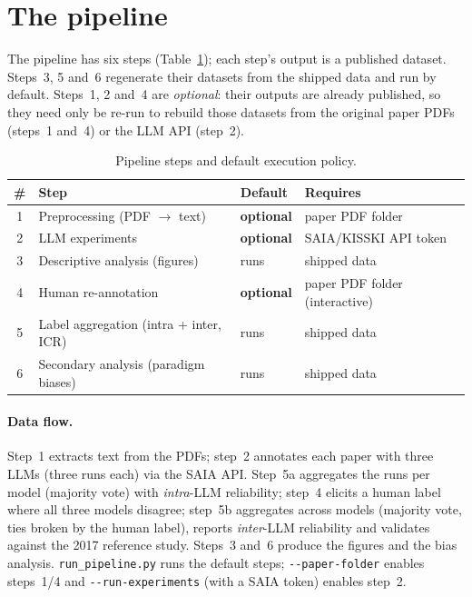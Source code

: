 \documentclass[english,biblatex]{lni}
\begin{document}
\section{The pipeline}
The pipeline has six steps (Table~\ref{tab:steps}); each step's output is a
published dataset. Steps~3, 5 and~6 regenerate their datasets from the shipped data
and run by default. Steps~1, 2 and~4 are \emph{optional}: their outputs are already
published, so they need only be re-run to rebuild those datasets from the original
paper PDFs (steps~1 and~4) or the LLM API (step~2).

\begin{table}[h]
\centering
\caption{Pipeline steps and default execution policy.}
\label{tab:steps}
\begin{tabular}{clll}
\toprule
\# & Step & Default & Requires \\
\midrule
1 & Preprocessing (PDF $\rightarrow$ text)      & \textbf{optional} & paper PDF folder \\
2 & LLM experiments                              & \textbf{optional} & SAIA/KISSKI API token \\
3 & Descriptive analysis (figures)               & runs             & shipped data \\
4 & Human re-annotation                          & \textbf{optional} & paper PDF folder (interactive) \\
5 & Label aggregation (intra + inter, ICR)       & runs             & shipped data \\
6 & Secondary analysis (paradigm biases)         & runs             & shipped data \\
\bottomrule
\end{tabular}
\end{table}

\paragraph{Data flow.} Step~1 extracts text from the PDFs; step~2 annotates each
paper with three LLMs (three runs each) via the SAIA API. Step~5a aggregates the
runs per model (majority vote) with \emph{intra}-LLM reliability; step~4 elicits a human label
where all three models disagree; step~5b aggregates across models (majority vote,
ties broken by the human label), reports \emph{inter}-LLM reliability and validates against the
2017 reference study. Steps~3 and~6 produce the figures and the bias analysis.
\texttt{run\_pipeline.py} runs the default steps; \texttt{-{}-paper-folder} enables
steps~1/4 and \texttt{-{}-run-experiments} (with a SAIA token) enables step~2.
\end{document}
